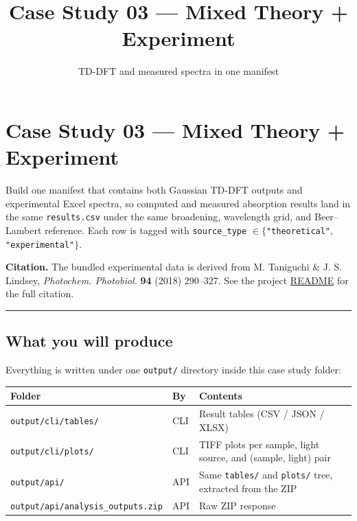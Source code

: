 \documentclass[
  11pt,
]{article}
\title{Case Study 03 — Mixed Theory + Experiment}
\subtitle{TD-DFT and measured spectra in one manifest}
\author{}
\date{}
\begin{document}
\maketitle

{
\hypersetup{linkcolor=}
\setcounter{tocdepth}{2}
\tableofcontents
}
\hypertarget{case-study-03--mixed-theory--experiment}{
\section{Case Study 03 --- Mixed Theory +
Experiment}\label{case-study-03--mixed-theory--experiment}}

Build one manifest that contains both Gaussian TD-DFT outputs and
experimental Excel spectra, so computed and measured absorption results
land in the same \texttt{results.csv} under the same broadening,
wavelength grid, and Beer--Lambert reference. Each row is tagged with
\texttt{source\_type} \(\in \{\)\texttt{"theoretical"}, \texttt{"experimental"}\(\}\).

\textbf{Citation.} The bundled experimental data is derived from M.
Taniguchi \& J. S. Lindsey, \emph{Photochem. Photobiol.} \textbf{94}
(2018) 290--327. See the project
\href{https://github.com/pinarsyt/overlap-calculator/blob/main/README.md\#acknowledgement-of-third-party-data}{README}
for the full citation.

\begin{center}\rule{0.5\linewidth}{0.5pt}\end{center}

\hypertarget{what-you-will-produce}{
\subsection{What you will produce}\label{what-you-will-produce}}

Everything is written under one \texttt{output/} directory inside this
case study folder:

\begin{longtable}[]{@{}lll@{}}
\toprule
Folder & By & Contents \\
\midrule
\endhead
\texttt{output/cli/tables/} & CLI & Result tables (CSV / JSON / XLSX) \\
\texttt{output/cli/plots/} & CLI & TIFF plots per sample, light source,
and (sample, light) pair \\
\texttt{output/api/} & API & Same \texttt{tables/} and \texttt{plots/}
tree, extracted from the ZIP \\
\texttt{output/api/analysis\_outputs.zip} & API & Raw ZIP response \\
\bottomrule
\end{longtable}
\end{document}
